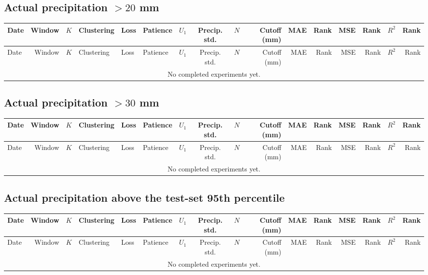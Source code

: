 \documentclass[10pt]{article}
\begin{document}
\begin{landscape}
\subsection*{Actual precipitation $>20$ mm}
\footnotesize
\setlength{\tabcolsep}{3pt}
\begin{longtable}{@{}lrrlllrcrrrrrrrr@{}}
\toprule
Date & Window & $K$ & Clustering & Loss & Patience & $U_1$ & Precip. std. & $N$ & Cutoff (mm) & MAE & Rank & MSE & Rank & $R^2$ & Rank \\
\midrule
\endfirsthead
\toprule
Date & Window & $K$ & Clustering & Loss & Patience & $U_1$ & Precip. std. & $N$ & Cutoff (mm) & MAE & Rank & MSE & Rank & $R^2$ & Rank \\
\midrule
\endhead
\multicolumn{16}{c}{No completed experiments yet.} \\
\bottomrule
\end{longtable}
\clearpage
\subsection*{Actual precipitation $>30$ mm}
\footnotesize
\setlength{\tabcolsep}{3pt}
\begin{longtable}{@{}lrrlllrcrrrrrrrr@{}}
\toprule
Date & Window & $K$ & Clustering & Loss & Patience & $U_1$ & Precip. std. & $N$ & Cutoff (mm) & MAE & Rank & MSE & Rank & $R^2$ & Rank \\
\midrule
\endfirsthead
\toprule
Date & Window & $K$ & Clustering & Loss & Patience & $U_1$ & Precip. std. & $N$ & Cutoff (mm) & MAE & Rank & MSE & Rank & $R^2$ & Rank \\
\midrule
\endhead
\multicolumn{16}{c}{No completed experiments yet.} \\
\bottomrule
\end{longtable}
\clearpage
\subsection*{Actual precipitation above the test-set 95th percentile}
\footnotesize
\setlength{\tabcolsep}{3pt}
\begin{longtable}{@{}lrrlllrcrrrrrrrr@{}}
\toprule
Date & Window & $K$ & Clustering & Loss & Patience & $U_1$ & Precip. std. & $N$ & Cutoff (mm) & MAE & Rank & MSE & Rank & $R^2$ & Rank \\
\midrule
\endfirsthead
\toprule
Date & Window & $K$ & Clustering & Loss & Patience & $U_1$ & Precip. std. & $N$ & Cutoff (mm) & MAE & Rank & MSE & Rank & $R^2$ & Rank \\
\midrule
\endhead
\multicolumn{16}{c}{No completed experiments yet.} \\
\bottomrule
\end{longtable}
\clearpage

\end{landscape}
\end{document}
